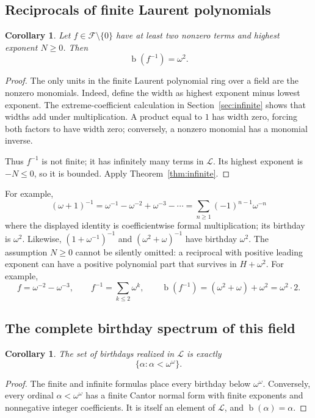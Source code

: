 \documentclass[11pt,letterpaper]{article}
\numberwithin{equation}{section}
\newtheorem{corollary}[theorem]{Corollary}
\theoremstyle{definition}
\theoremstyle{remark}
\newcommand{\Lau}{\mathcal{L}}
\newcommand{\Fin}{\mathcal{F}}
\newcommand{\bd}{\operatorname{b}}
\begin{document}
\subsection{Reciprocals of finite Laurent polynomials}
\begin{corollary}\label{cor:reciprocal}
Let $f\in\Fin\setminus\{0\}$ have at least two nonzero terms and highest
exponent $N\geq0$. Then
\begin{equation}\label{eq:reciprocal}
 \bd(f^{-1})=\omega^2.
\end{equation}
\end{corollary}
\begin{proof}
The only units in the finite Laurent polynomial ring over a field are the
nonzero monomials. Indeed, define the width as highest exponent minus lowest
exponent. The extreme-coefficient calculation in Section~\ref{sec:infinite}
shows that widths add under multiplication. A product equal to $1$ has width
zero, forcing both factors to have width zero; conversely, a nonzero monomial
has a monomial inverse.

Thus $f^{-1}$ is not finite; it has infinitely many terms in $\Lau$. Its
highest exponent is $-N\leq0$, so it is bounded. Apply
Theorem~\ref{thm:infinite}.
\end{proof}

For example,
\[
 (\omega+1)^{-1}
 =\omega^{-1}-\omega^{-2}+\omega^{-3}-\cdots
=\sum_{n\geq1}(-1)^{n-1}\omega^{-n}
\]
where the displayed identity is coefficientwise formal multiplication; its
birthday is $\omega^2$. Likewise, $(1+\omega^{-1})^{-1}$ and
$(\omega^2+\omega)^{-1}$ have birthday $\omega^2$.
The assumption $N\geq0$ cannot be silently omitted: a reciprocal with positive
leading exponent can have a positive polynomial part that survives in
$H+\omega^2$. For example,
\[
 f=\omega^{-2}-\omega^{-3},\qquad
 f^{-1}=\sum_{k\leq2}\omega^k,\qquad
 \bd(f^{-1})=(\omega^2+\omega)+\omega^2=\omega^2\cdot2.
\]

\subsection{The complete birthday spectrum of this field}
\begin{corollary}\label{cor:spectrum}
The set of birthdays realized in $\Lau$ is exactly
\[
 \{\alpha:\alpha<\omega^\omega\}.
\]
\end{corollary}
\begin{proof}
The finite and infinite formulas place every birthday below $\omega^\omega$.
Conversely, every ordinal $\alpha<\omega^\omega$ has a finite Cantor normal
form with finite exponents and nonnegative integer coefficients. It is itself
an element of $\Lau$, and $\bd(\alpha)=\alpha$.
\end{proof}
\end{document}
